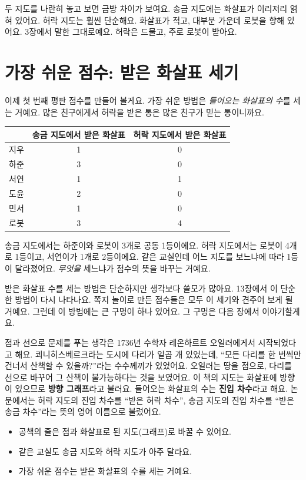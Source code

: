 두 지도를 나란히 놓고 보면 금방 차이가 보여요.
송금 지도에는 화살표가 이리저리 얽혀 있어요.
허락 지도는 훨씬 단순해요.
화살표가 적고, 대부분 가운데 로봇을 향해 있어요.
3장에서 말한 그대로예요.
허락은 드물고, 주로 로봇이 받아요.

\section{가장 쉬운 점수: 받은 화살표 세기}

이제 첫 번째 평판 점수를 만들어 볼게요.
가장 쉬운 방법은 \emph{들어오는 화살표의 수}를 세는 거예요.
많은 친구에게서 허락을 받은 통은 많은 친구가 믿는 통이니까요.

\begin{center}
\small
\begin{tabular}{@{}lcc@{}}
\toprule
& 송금 지도에서 받은 화살표 & 허락 지도에서 받은 화살표 \\
\midrule
지우 & 1 & 0 \\
하준 & 3 & 0 \\
서연 & 1 & 1 \\
도윤 & 2 & 0 \\
민서 & 1 & 0 \\
로봇 & 3 & 4 \\
\bottomrule
\end{tabular}
\end{center}

송금 지도에서는 하준이와 로봇이 3개로 공동 1등이에요.
허락 지도에서는 로봇이 4개로 1등이고, 서연이가 1개로 2등이에요.
같은 교실인데 어느 지도를 보느냐에 따라 1등이 달라졌어요.
\emph{무엇을} 세느냐가 점수의 뜻을 바꾸는 거예요.

받은 화살표 수를 세는 방법은 단순하지만 생각보다 쓸모가 많아요.
13장에서 이 단순한 방법이 다시 나타나요. 쪽지 놀이로 만든 점수들은 모두 이 세기와 견주어 보게 될 거예요.
그런데 이 방법에는 큰 구멍이 하나 있어요.
그 구멍은 다음 장에서 이야기할게요.

\begin{deeper}[그래프의 역사]
점과 선으로 문제를 푸는 생각은 1736년 수학자 레온하르트 오일러에게서 시작되었다고 해요.
쾨니히스베르크라는 도시에 다리가 일곱 개 있었는데,
“모든 다리를 한 번씩만 건너서 산책할 수 있을까?”라는 수수께끼가 있었어요.
오일러는 땅을 점으로, 다리를 선으로 바꾸어 그 산책이 불가능하다는 것을 보였어요.
이 책의 지도는 화살표에 방향이 있으므로 \textbf{방향 그래프}라고 불러요.
들어오는 화살표의 수는 \textbf{진입 차수}라고 해요.
논문에서는 허락 지도의 진입 차수를 “받은 허락 차수”, 송금 지도의 진입 차수를 “받은 송금 차수”라는 뜻의 영어 이름으로 불렀어요.
\end{deeper}

\begin{learned}
\begin{itemize}
\item 공책의 줄은 점과 화살표로 된 지도(그래프)로 바꿀 수 있어요.
\item 같은 교실도 송금 지도와 허락 지도가 아주 달라요.
\item 가장 쉬운 점수는 받은 화살표의 수를 세는 거예요.
\end{itemize}
\end{learned}
